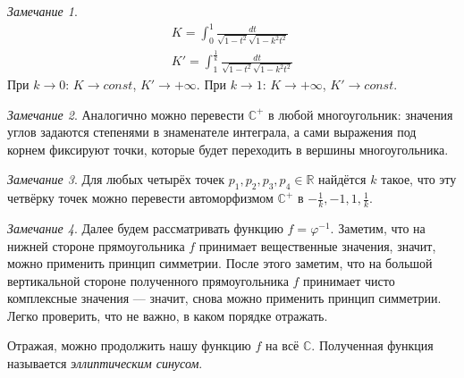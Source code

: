 \documentclass[12pt]{article}
\newcommand{\R}{\mathbb{R}}
\renewcommand{\C}{\mathbb{C}}
\theoremstyle{thmnote}
\theoremstyle{remark}
\newtheorem*{remark}{Замечание}
\theoremstyle{defnote}
\begin{document}
\begin{remark}
    \begin{gather*}
        K = \int_0^1 \frac{dt}{\sqrt{1 - t^2} \sqrt{1 - k^2 t^2}} \\
        K' = \int_1^{\frac{1}{k}} \frac{dt}{\sqrt{1 - t^2} \sqrt{1 - k^2 t^2}}
    \end{gather*}
    При $k \to 0$: $K \to const$, $K' \to +\infty$. При $k \to 1$: $K \to +\infty$, $K' \to const$.
\end{remark}

\begin{remark}
    Аналогично можно перевести $\C^+$ в любой многоугольник: значения углов задаются степенями в знаменателе интеграла, а сами выражения под корнем фиксируют точки, которые будет переходить в вершины многоугольника.
\end{remark}

\begin{remark}
    Для любых четырёх точек $p_1, p_2, p_3, p_4 \in \R$ найдётся $k$ такое, что эту четвёрку точек можно перевести автоморфизмом $\C^+$ в $-\frac{1}{k}, -1, 1, \frac{1}{k}$.
\end{remark}

\begin{remark}
    Далее будем рассматривать функцию $f = \varphi^{-1}$. Заметим, что на нижней стороне прямоугольника $f$ принимает вещественные значения, значит, можно применить принцип симметрии. После этого заметим, что на большой вертикальной стороне полученного прямоугольника $f$ принимает чисто комплексные значения --- значит, снова можно применить принцип симметрии. Легко проверить, что не важно, в каком порядке отражать.
    \begin{center}
    \begin{tikzpicture}
        
    \end{tikzpicture}
    \end{center}

    Отражая, можно продолжить нашу функцию $f$ на всё $\C$. Полученная функция называется \textit{эллиптическим синусом}.
\end{remark}
\end{document}
